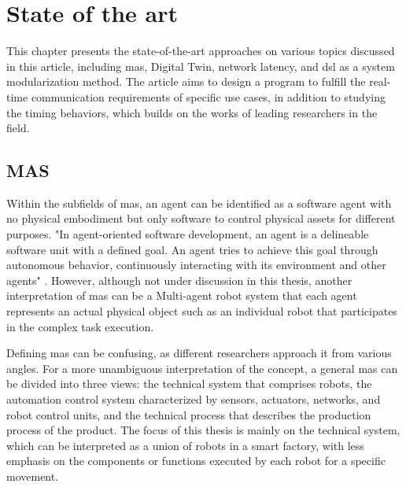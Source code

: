 \chapter{State of the art}%
This chapter presents the state-of-the-art approaches on various topics 
discussed 
in this article, including \gls{mas}, Digital Twin, network latency, 
and \gls{dsl} as a system modularization method. The article aims to 
design a program to fulfill the real-time communication requirements 
of specific use cases, in addition to studying the timing behaviors, 
which builds on the works of leading researchers in the field.

\section{MAS}

Within the subfields of \gls{mas}, an agent can be identified as a software agent with no physical embodiment but only software to control physical assets for different purposes. "In agent-oriented software development, an agent is a delineable software unit with a defined goal. An agent tries to achieve this goal through autonomous behavior, continuously interacting with its environment and other agents" \cite{wagner_agentenunterstutztes_2008}. However, although not under discussion in this thesis, another interpretation of \gls{mas} can be a Multi-agent robot system that each agent represents an actual physical object such as an individual robot that participates in the complex task execution\cite{ota_multi-agent_2006}.   


Defining \gls{mas} can be confusing, as different researchers approach it from various angles. For a more unambiguous interpretation of the concept, a general \gls{mas} can be divided into three views: the technical system that comprises robots, the automation control system characterized by sensors, actuators, networks, and robot control units, and the technical process that describes the production process of the product\cite{lauber_prozessautomatisierung_1999}\cite{wannagat_agent_nodate}. The focus of this thesis is mainly on the technical system, which can be interpreted as a union of robots in a smart factory, with less emphasis on the components or functions executed by each robot for a specific movement.

